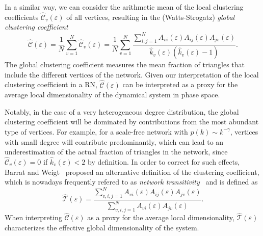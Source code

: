 In a similar way, we can consider the arithmetic mean of the local clustering coefficients $\hat{\mathcal{C}}_v(\varepsilon)$ of all vertices, resulting in the (Watts-Strogatz) \textit{global clustering coefficient}~\cite{Watts1998}
\begin{equation}
\hat{\mathcal{C}}(\varepsilon)=\frac{1}{N}\sum_{v=1}^N \hat{\mathcal{C}}_v(\varepsilon)
= \frac{1}{N}\sum_{v=1}^N \frac{\sum_{i,j=1}^N A_{vi}(\varepsilon) A_{ij}(\varepsilon) A_{jv}(\varepsilon)}{\hat{k}_v(\varepsilon)(\hat{k}_v(\varepsilon)-1)}.
\label{eq:globclustering}
\end{equation}
\noindent
The global clustering coefficient measures the mean fraction of triangles that include the different vertices of the network. Given our interpretation of the local clustering coefficient in a RN, $\hat{\mathcal{C}}(\varepsilon)$ can be interpreted as a proxy for the average local dimensionality of the dynamical system in phase space.

Notably, in the case of a very heterogeneous degree distribution, the global clustering coefficient will be dominated by contributions from the most abundant type of vertices. For example, for a scale-free network with $p(k)\sim k^{-\gamma}$, vertices with small degree will contribute predominantly, which can lead to an underestimation of the actual fraction of triangles in the network, since $\hat{\mathcal{C}}_v(\varepsilon)=0$ if $\hat{k}_v(\varepsilon)<2$ by definition. In order to correct for such effects, Barrat and Weigt~\cite{Barrat2000} proposed an alternative definition of the clustering coefficient, which is nowadays frequently refered to as \textit{network transitivity}~\cite{Boccaletti2006} and is defined as
\begin{equation}
\hat{\mathcal{T}}(\varepsilon)= \frac{\sum_{v,i,j=1}^N A_{vi}(\varepsilon) A_{ij}(\varepsilon) A_{jv}(\varepsilon)}{\sum_{v,i,j=1}^N A_{vi}(\varepsilon) A_{jv}(\varepsilon)}.
\label{eq:transitivity}
\end{equation}
\noindent
When interpreting $\hat{\mathcal{C}}(\varepsilon)$ as a proxy for the average local dimensionality, $\hat{\mathcal{T}}(\varepsilon)$ characterizes the effective global dimensionality of the system.

